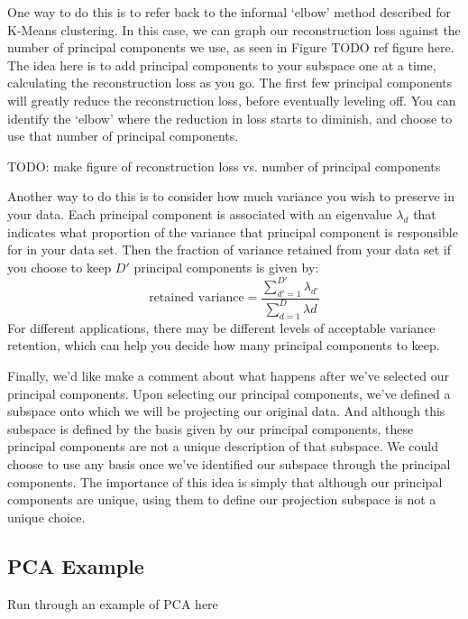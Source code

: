 One way to do this is to refer back to the informal `elbow' method described for K-Means clustering. In this case, we can graph our reconstruction loss against the number of principal components we use, as seen in Figure TODO ref figure here. The idea here is to add principal components to your subspace one at a time, calculating the reconstruction loss as you go. The first few principal components will greatly reduce the reconstruction loss, before eventually leveling off. You can identify the `elbow' where the reduction in loss starts to diminish, and choose to use that number of principal components.

TODO: make figure of reconstruction loss vs. number of principal components

Another way to do this is to consider how much variance you wish to preserve in your data. Each principal component is associated with an eigenvalue $\lambda_{d}$ that indicates what proportion of the variance that principal component is responsible for in your data set. Then the fraction of variance retained from your data set if you choose to keep $D'$ principal components is given by:
\begin{equation} \label{variance-retention}
    \text{retained variance} = \frac{\sum_{d'=1}^{D'} \lambda_{d'}}{\sum_{d=1}^{D} \lambda{d}}
\end{equation}
For different applications, there may be different levels of acceptable variance retention, which can help you decide how many principal components to keep.

Finally, we'd like make a comment about what happens after we've selected our principal components. Upon selecting our principal components, we've defined a subspace onto which we will be projecting our original data. And although this subspace is defined by the basis given by our principal components, these principal components are not a unique description of that subspace. We could choose to use any basis once we've identified our subspace through the principal components. The importance of this idea is simply that although our principal components are unique, using them to define our projection subspace is not a unique choice.

\subsection{PCA Example}
Run through an example of PCA here
